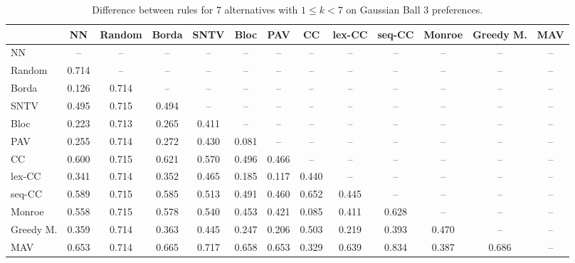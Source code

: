 
\begin{table*}[h!]
\centering
\begin{tabular}{lcccccccccccc}
\toprule
 & NN & Random & Borda & SNTV & Bloc & PAV & CC & lex-CC & seq-CC & Monroe & Greedy M. & MAV \\
\midrule
NN & -- & -- & -- & -- & -- & -- & -- & -- & -- & -- & -- & -- \\
Random & 0.714 & -- & -- & -- & -- & -- & -- & -- & -- & -- & -- & -- \\
Borda & 0.126 & 0.714 & -- & -- & -- & -- & -- & -- & -- & -- & -- & -- \\
SNTV & 0.495 & 0.715 & 0.494 & -- & -- & -- & -- & -- & -- & -- & -- & -- \\
Bloc & 0.223 & 0.713 & 0.265 & 0.411 & -- & -- & -- & -- & -- & -- & -- & -- \\
PAV & 0.255 & 0.714 & 0.272 & 0.430 & 0.081 & -- & -- & -- & -- & -- & -- & -- \\
CC & 0.600 & 0.715 & 0.621 & 0.570 & 0.496 & 0.466 & -- & -- & -- & -- & -- & -- \\
lex-CC & 0.341 & 0.714 & 0.352 & 0.465 & 0.185 & 0.117 & 0.440 & -- & -- & -- & -- & -- \\
seq-CC & 0.589 & 0.715 & 0.585 & 0.513 & 0.491 & 0.460 & 0.652 & 0.445 & -- & -- & -- & -- \\
Monroe & 0.558 & 0.715 & 0.578 & 0.540 & 0.453 & 0.421 & 0.085 & 0.411 & 0.628 & -- & -- & -- \\
Greedy M. & 0.359 & 0.714 & 0.363 & 0.445 & 0.247 & 0.206 & 0.503 & 0.219 & 0.393 & 0.470 & -- & -- \\
MAV & 0.653 & 0.714 & 0.665 & 0.717 & 0.658 & 0.653 & 0.329 & 0.639 & 0.834 & 0.387 & 0.686 & -- \\
\bottomrule
\end{tabular}

\caption{Difference between rules for 7 alternatives with $1 \leq k < 7$ on Gaussian Ball 3 preferences.}
\end{table*}
